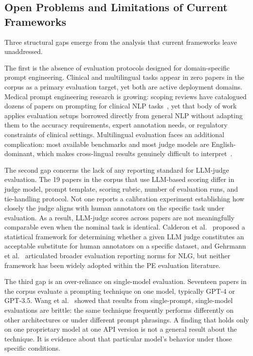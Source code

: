\documentclass[journal]{IEEEtran}
\begin{document}
\subsection{Open Problems and Limitations of Current Frameworks}

Three structural gaps emerge from the analysis that current
frameworks leave unaddressed.

The first is the absence of evaluation protocols designed for
domain-specific prompt engineering. Clinical and multilingual tasks
appear in zero papers in the corpus as a primary evaluation target,
yet both are active deployment domains. Medical prompt engineering
research is growing: scoping reviews have catalogued dozens of papers
on prompting for clinical NLP tasks~\cite{clinicalnlp2024}, yet that
body of work applies evaluation setups borrowed directly from general NLP without
adapting them to the accuracy requirements, expert annotation needs,
or regulatory constraints of clinical settings. Multilingual evaluation
faces an additional complication: most available benchmarks and most judge
models are English-dominant, which makes cross-lingual results genuinely difficult to
interpret~\cite{vatsal2024survey}.

The second gap concerns the lack of any reporting standard for LLM-judge
evaluation. The 19 papers in the corpus that use LLM-based
scoring differ in judge model, prompt template, scoring rubric, number
of evaluation runs, and tie-handling protocol. Not one reports a calibration
experiment establishing how closely the judge aligns with human
annotators on the specific task under evaluation. As a result,
LLM-judge scores across papers are not meaningfully comparable even
when the nominal task is identical. Calderon et al.~\cite{alternativeannotator2025} proposed a
statistical framework for determining whether a given LLM judge constitutes an
acceptable substitute for human annotators on a specific dataset, and
Gehrmann et al.~\cite{repairing2022} articulated broader evaluation reporting
norms for NLG, but neither framework has been widely adopted within
the PE evaluation literature.

The third gap is an over-reliance on single-model evaluation. Seventeen papers in the
corpus evaluate a prompting technique on one model, typically GPT-4
or GPT-3.5. Wang et al.~\cite{wang2023multi} showed that results from
single-prompt, single-model evaluations are brittle: the same
technique frequently performs differently on other architectures or
under different prompt phrasings. A finding that holds only on one
proprietary model at one API version is not a general result about the
technique. It is evidence about that particular model's behavior under those
specific conditions.
\end{document}
